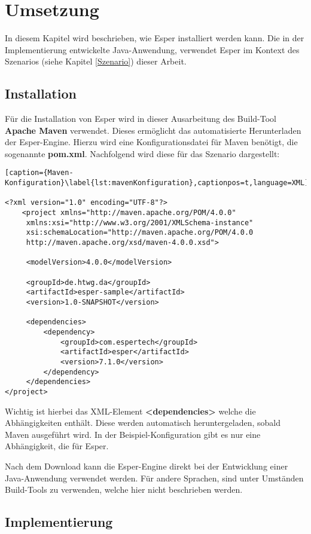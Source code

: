\chapter{Umsetzung}
In diesem Kapitel wird beschrieben, wie Esper installiert werden kann. Die in der Implementierung entwickelte Java-Anwendung, verwendet Esper im Kontext des Szenarios (siehe Kapitel \ref{Szenario}) dieser Arbeit.
\section{Installation}
Für die Installation von Esper wird in dieser Ausarbeitung des Build-Tool \textbf{Apache Maven} verwendet. 
Dieses ermöglicht das automatisierte Herunterladen der Esper-Engine. Hierzu wird eine Konfigurationsdatei für Maven benötigt, die sogenannte \textbf{pom.xml}. Nachfolgend wird diese für das Szenario dargestellt:

\begin{lstlisting}[caption={Maven-Konfiguration}\label{lst:mavenKonfiguration},captionpos=t,language=XML]

<?xml version="1.0" encoding="UTF-8"?>
    <project xmlns="http://maven.apache.org/POM/4.0.0"
     xmlns:xsi="http://www.w3.org/2001/XMLSchema-instance"
     xsi:schemaLocation="http://maven.apache.org/POM/4.0.0
     http://maven.apache.org/xsd/maven-4.0.0.xsd">
		
     <modelVersion>4.0.0</modelVersion>

     <groupId>de.htwg.da</groupId>
     <artifactId>esper-sample</artifactId>
     <version>1.0-SNAPSHOT</version>

     <dependencies>
         <dependency>
             <groupId>com.espertech</groupId>
             <artifactId>esper</artifactId>
             <version>7.1.0</version>
         </dependency>
     </dependencies>
</project>
\end{lstlisting}

Wichtig ist hierbei das XML-Element \textbf{<dependencies>} welche die Abhängigkeiten enthält. Diese werden automatisch heruntergeladen, sobald Maven ausgeführt wird. In der Beispiel-Konfiguration gibt es nur eine Abhängigkeit, die für Esper.

Nach dem Download kann die Esper-Engine direkt bei der Entwicklung einer Java-Anwendung verwendet werden. Für andere Sprachen, sind unter Umständen Build-Tools zu verwenden, welche hier nicht beschrieben werden.


\section{Implementierung}

